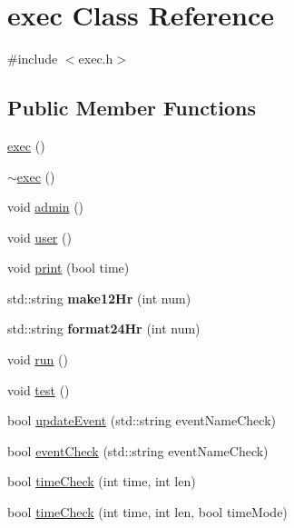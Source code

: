\hypertarget{classexec}{}\section{exec Class Reference}
\label{classexec}


{\ttfamily \#include $<$exec.\+h$>$}

\subsection*{Public Member Functions}
\begin{DoxyCompactItemize}
\item 
\hyperlink{classexec_a2fac94db8f997a01a590c01478662339}{exec} ()
\item 
\hyperlink{classexec_a663a64f17c5431dc01a829f5633e4f56}{$\sim$exec} ()
\item 
void \hyperlink{classexec_a9d632d01c033f970fb246864bff38b60}{admin} ()
\item 
void \hyperlink{classexec_a924407f4d277807e949aa9e97470f536}{user} ()
\item 
void \hyperlink{classexec_a4cf771a565711689023aa75141f82c52}{print} (bool time)
\item 
std\+::string {\bfseries make12\+Hr} (int num)\hypertarget{classexec_ade14fc20cd40b2d5e3e8e5abbda382d4}{}\label{classexec_ade14fc20cd40b2d5e3e8e5abbda382d4}

\item 
std\+::string {\bfseries format24\+Hr} (int num)\hypertarget{classexec_a24a4ca6c8f63a73ed38ddc8e9d015c46}{}\label{classexec_a24a4ca6c8f63a73ed38ddc8e9d015c46}

\item 
void \hyperlink{classexec_aad3ea9a2cd99fc28471062719b85b1f6}{run} ()
\item 
void \hyperlink{classexec_af6f7f6a6d2e09aa2d2616dddb58af53a}{test} ()
\item 
bool \hyperlink{classexec_a1d2075b76a47a05795d8ac9d6fb24cbe}{update\+Event} (std\+::string event\+Name\+Check)
\item 
bool \hyperlink{classexec_abf1c735a300deae3f5de4bf6891f2190}{event\+Check} (std\+::string event\+Name\+Check)
\item 
bool \hyperlink{classexec_a7e711b54128bd8ff8039886ce4ce6fb3}{time\+Check} (int time, int len)
\item 
bool \hyperlink{classexec_afc82b1343e127d9a7bdc36f050bdf605}{time\+Check} (int time, int len, bool time\+Mode)
\end{DoxyCompactItemize}


